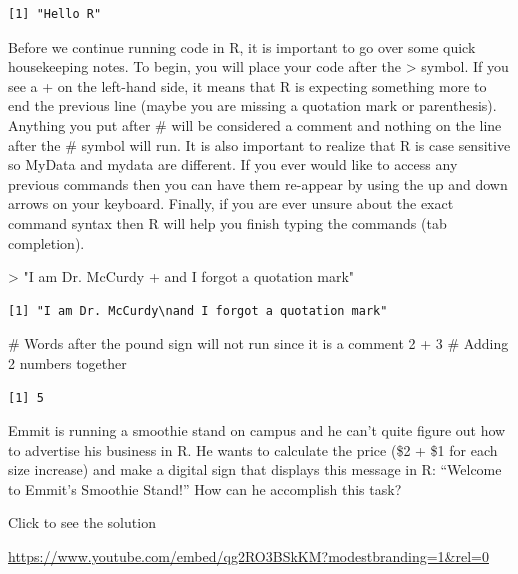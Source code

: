 \documentclass[
  letterpaper,
  DIV=11,
  numbers=noendperiod]{scrreprt}
\newenvironment{Shaded}{\begin{snugshade}}{\end{snugshade}}
\newcommand{\CommentTok}[1]{\textcolor[rgb]{0.37,0.37,0.37}{#1}}
\newcommand{\DecValTok}[1]{\textcolor[rgb]{0.68,0.00,0.00}{#1}}
\newcommand{\SpecialCharTok}[1]{\textcolor[rgb]{0.37,0.37,0.37}{#1}}
\newcommand{\StringTok}[1]{\textcolor[rgb]{0.13,0.47,0.30}{#1}}
\begin{document}
\begin{verbatim}
[1] "Hello R"
\end{verbatim}

Before we continue running code in R, it is important to go over some
quick housekeeping notes. To begin, you will place your code after the
\textgreater{} symbol. If you see a + on the left-hand side, it means
that R is expecting something more to end the previous line (maybe you
are missing a quotation mark or parenthesis). Anything you put after \#
will be considered a comment and nothing on the line after the \# symbol
will run. It is also important to realize that R is case sensitive so
MyData and mydata are different. If you ever would like to access any
previous commands then you can have them re-appear by using the up and
down arrows on your keyboard. Finally, if you are ever unsure about the
exact command syntax then R will help you finish typing the commands
(tab completion).

\begin{Shaded}
\begin{Highlighting}[]
\SpecialCharTok{\textgreater{}} \StringTok{"I am Dr. McCurdy}
\StringTok{+ and I forgot a quotation mark"}
\end{Highlighting}
\end{Shaded}

\begin{verbatim}
[1] "I am Dr. McCurdy\nand I forgot a quotation mark"
\end{verbatim}

\begin{Shaded}
\begin{Highlighting}[]
\CommentTok{\# Words after the pound sign will not run since it is a comment}
\DecValTok{2} \SpecialCharTok{+} \DecValTok{3} \CommentTok{\# Adding 2 numbers together}
\end{Highlighting}
\end{Shaded}

\begin{verbatim}
[1] 5
\end{verbatim}

\begin{tcolorbox}[enhanced jigsaw, colframe=quarto-callout-tip-color-frame, colback=white, breakable, rightrule=.15mm, title=\textcolor{quarto-callout-tip-color}{\faLightbulb}\hspace{0.5em}{Try it Out}, bottomtitle=1mm, toptitle=1mm, titlerule=0mm, left=2mm, coltitle=black, colbacktitle=quarto-callout-tip-color!10!white, leftrule=.75mm, opacitybacktitle=0.6, bottomrule=.15mm, opacityback=0, arc=.35mm, toprule=.15mm]

Emmit is running a smoothie stand on campus and he can't quite figure
out how to advertise his business in R. He wants to calculate the price
(\$2 + \$1 for each size increase) and make a digital sign that displays
this message in R: ``Welcome to Emmit's Smoothie Stand!'' How can he
accomplish this task?

Click to see the solution

\url{https://www.youtube.com/embed/qg2RO3BSkKM?modestbranding=1&rel=0}

\end{tcolorbox}
\end{document}
